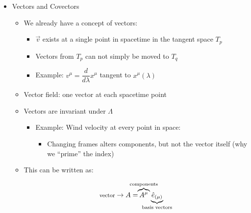 \begin{itemize}
\begin{itemize}
      \item In 4D, spatial rotations and boosts form the Lorentz transformations (group) and translations $\to$ Poincar\'e group

    \end{itemize}

  \item Vectors and Covectors

    \begin{itemize}

      \item We already have a concept of vectors:

        \begin{itemize}

          \item $\vec{v}$ exists at a single point in spacetime in the tangent space $T_p$

          \item Vectors from $T_p$ can not simply be moved to $T_q$

          \item Example: $v^{\mu}=\dfrac{d}{d\lambda}x^{\mu}$ tangent to $x^{\mu}(\lambda)$

        \end{itemize}

      \item Vector field: one vector at each spacetime point

      \item Vectors are invariant under $\Lambda$

        \begin{itemize}

          \item Example: Wind velocity at every point in space:

            \begin{itemize}

              \item Changing frames alters components, but not the vector itself (why we ``prime'' the index)

            \end{itemize}

        \end{itemize}

      \item This can be written as:

        $$\text{\footnotesize vector}\to A=\hspace{-15pt}\overbrace{A^{\mu}}^{\text{components}}\hspace{-25pt}\underbrace{\hat{e}_{(\mu)}}_{\text{basis vectors}}$$


\end{itemize}
\end{itemize}
